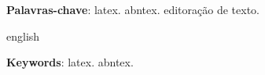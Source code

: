 \begin{resumoumacoluna}

    \vspace{\onelineskip}

    \noindent
    \textbf{Palavras-chave}: latex. abntex. editoração de texto.
\end{resumoumacoluna}

\renewcommand{\resumoname}{Abstract}
\begin{resumoumacoluna}
    \begin{otherlanguage*}{english}

        \vspace{\onelineskip}

        \noindent
        \textbf{Keywords}: latex. abntex.
    \end{otherlanguage*}
\end{resumoumacoluna}
